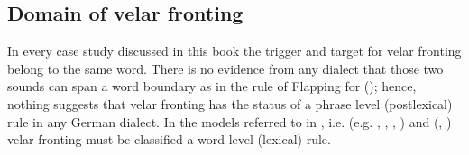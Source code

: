 \subsection{Domain of velar fronting}\label{sec:12.8.2}

In every case study discussed in this book the trigger and target for velar fronting belong to the same word. There is no evidence from any dialect that those two sounds can span a word boundary as in the rule of Flapping for  (); hence, nothing suggests that velar fronting has the status of a phrase level (postlexical) rule in any German dialect. In the models referred to in , i.e.  (e.g. \citealt{Kiparsky1982b}, \citealt{KaisseShaw1985}, \citealt{Mohanan1986}, \citealt{HargusKaisse1993}) and  (\citealt{KaisseMcMahon2011}, \citealt{Bermúdez-Otero2015}) velar fronting must be classified a word level (lexical) rule.

